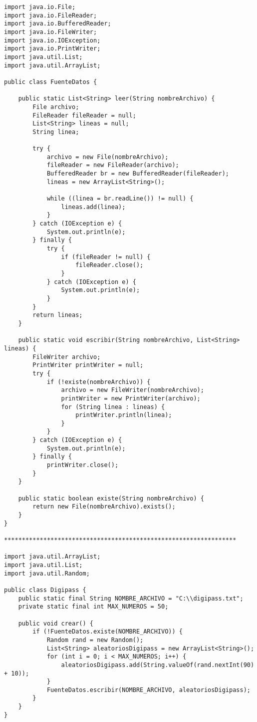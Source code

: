 \documentclass[10pt]{article}
\begin{document}
{\begin{enumerate}
\begin{verbatim}
import java.io.File;
import java.io.FileReader;
import java.io.BufferedReader;
import java.io.FileWriter;
import java.io.IOException;
import java.io.PrintWriter;
import java.util.List;
import java.util.ArrayList;

public class FuenteDatos {

    public static List<String> leer(String nombreArchivo) {
        File archivo;
        FileReader fileReader = null;
        List<String> lineas = null;
        String linea;

        try {
            archivo = new File(nombreArchivo);
            fileReader = new FileReader(archivo);
            BufferedReader br = new BufferedReader(fileReader);
            lineas = new ArrayList<String>();

            while ((linea = br.readLine()) != null) {
                lineas.add(linea);
            }
        } catch (IOException e) {
            System.out.println(e);
        } finally {
            try {
                if (fileReader != null) {
                    fileReader.close();
                }
            } catch (IOException e) {
                System.out.println(e);
            }
        }
        return lineas;
    }

    public static void escribir(String nombreArchivo, List<String> lineas) {
        FileWriter archivo;
        PrintWriter printWriter = null;
        try {
            if (!existe(nombreArchivo)) {
                archivo = new FileWriter(nombreArchivo);
                printWriter = new PrintWriter(archivo);
                for (String linea : lineas) {
                    printWriter.println(linea);
                }
            }
        } catch (IOException e) {
            System.out.println(e);
        } finally {
            printWriter.close();
        }
    }

    public static boolean existe(String nombreArchivo) {
        return new File(nombreArchivo).exists();
    }
}

*****************************************************************

import java.util.ArrayList;
import java.util.List;
import java.util.Random;

public class Digipass {
    public static final String NOMBRE_ARCHIVO = "C:\\digipass.txt";
    private static final int MAX_NUMEROS = 50;

    public void crear() {
        if (!FuenteDatos.existe(NOMBRE_ARCHIVO)) {
            Random rand = new Random();
            List<String> aleatoriosDigipass = new ArrayList<String>();
            for (int i = 0; i < MAX_NUMEROS; i++) {
                aleatoriosDigipass.add(String.valueOf(rand.nextInt(90) + 10));
            }
            FuenteDatos.escribir(NOMBRE_ARCHIVO, aleatoriosDigipass);
        }
    }
}


\end{verbatim}
\end{enumerate}}
\end{document}
